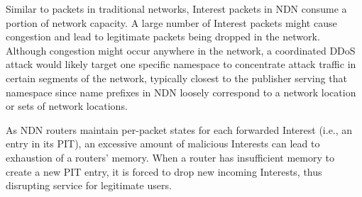 Similar to packets in traditional networks, Interest packets in NDN consume a portion of network capacity. A large number of Interest packets might cause congestion and lead to legitimate packets being dropped in the network. Although congestion might occur anywhere in the network, a coordinated DDoS attack would likely target one specific namespace to concentrate attack traffic in certain segments of the network, typically closest to the publisher serving that namespace since name prefixes in NDN loosely correspond to a network location or sets of network locations. 

As NDN routers maintain per-packet states for each forwarded Interest (i.e., an entry in its PIT), an excessive amount of malicious Interests can lead to exhaustion of a routers' memory. When a router has insufficient memory to create a new PIT entry, it is forced to drop new incoming Interests, thus disrupting service for legitimate users.





